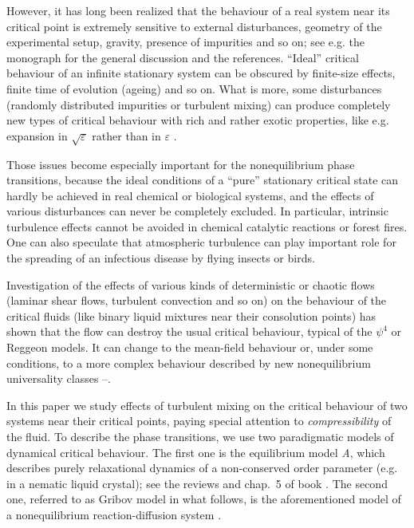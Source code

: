 \documentclass[12pt]{iopart}
\begin{document}
However, it has long been realized that the behaviour of a real system
near its critical point is extremely sensitive to external disturbances,
geometry of the experimental setup, gravity, presence of impurities and
so on; see e.g. the monograph \cite{Ivanov} for the general discussion and
the references. ``Ideal''  critical behaviour of an infinite stationary
system can be obscured by
finite-size effects, finite time of evolution (ageing) and so on.
What is more, some disturbances (randomly distributed impurities or
turbulent mixing) can produce completely new types of critical
behaviour with rich and rather exotic properties, like e.g. expansion in
$\sqrt{\varepsilon}$ rather than in $\varepsilon$  \cite{quench,Satten}.

Those issues become especially important for the nonequilibrium phase
transitions, because the ideal conditions of a ``pure'' stationary critical
state can hardly be achieved in real chemical or biological systems, and
the effects of various disturbances can never be completely excluded.
In particular, intrinsic turbulence effects cannot be avoided in
chemical catalytic reactions or forest fires. One can also speculate that
atmospheric turbulence can play important role for the spreading of an
infectious disease by flying insects or birds.

Investigation of the effects of various kinds of deterministic or chaotic
flows (laminar shear flows, turbulent convection and so on) on the behaviour
of the critical fluids (like binary liquid mixtures near their consolution
points) has shown that the flow can destroy the usual critical behaviour,
typical of the $\psi^{4}$ or Reggeon models. It can change to the mean-field
behaviour or, under some conditions, to a more complex behaviour described
by new nonequilibrium universality classes \cite{Satten}--\cite{AIM}.

In this paper we study effects of turbulent mixing on the critical behaviour
of two systems near their critical points, paying special attention to
{\it compressibility} of the fluid. To describe the phase transitions,
we use two
paradigmatic models of dynamical critical behaviour. The first one is the
equilibrium model {\it A}, which describes purely relaxational dynamics of
a non-conserved order parameter (e.g. in a nematic liquid crystal);
see the reviews \cite{HH} and chap.~5 of book \cite{Book3}. The second one,
referred to as Gribov model in what follows, is the aforementioned model
of a nonequilibrium reaction-diffusion system \cite{Hinr,JT}.
\end{document}
